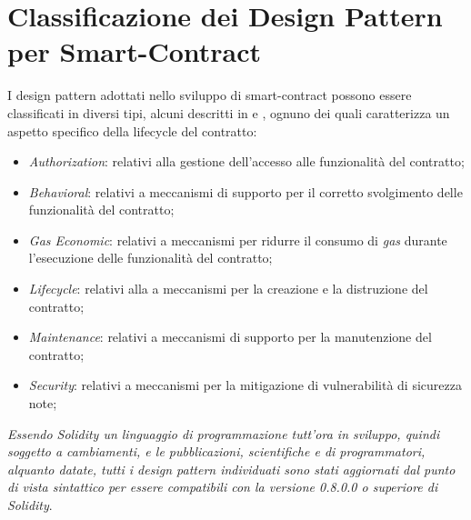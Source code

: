 \chapter{Classificazione dei Design Pattern per Smart-Contract}
I design pattern adottati nello sviluppo di smart-contract possono essere classificati in diversi tipi, alcuni descritti in \cite{9089272} e \cite{9050163}, ognuno dei quali caratterizza un aspetto specifico della lifecycle del contratto:

\begin{itemize}
	\item \textit{Authorization}: relativi alla gestione dell'accesso alle funzionalità del contratto;
	\item \textit{Behavioral}: relativi a meccanismi di supporto per il corretto svolgimento delle funzionalità del contratto;
	\item \textit{Gas Economic}: relativi a meccanismi per ridurre il consumo di \textit{gas} durante l'esecuzione delle funzionalità del contratto;
	\item \textit{Lifecycle}: relativi alla a meccanismi per la creazione e la distruzione del contratto;
	\item \textit{Maintenance}: relativi a meccanismi di supporto per la manutenzione del contratto;
	\item \textit{Security}: relativi a meccanismi per la mitigazione di vulnerabilità di sicurezza note;
\end{itemize}
\textit{Essendo Solidity un linguaggio di programmazione tutt'ora in sviluppo, quindi soggetto a cambiamenti, e le pubblicazioni, scientifiche e di programmatori, alquanto datate, tutti i design pattern individuati sono stati aggiornati dal punto di vista sintattico per essere compatibili con la versione 0.8.0.0 o superiore di Solidity}. 
\newpage
